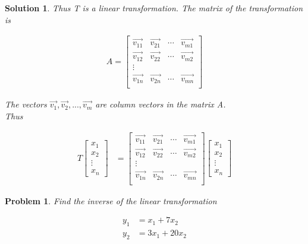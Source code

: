\documentclass{article}
\newtheorem{problem}{Problem}
\newtheorem*{solution}{Solution}
\begin{document}
\begin{solution}
Thus T is a linear transformation. The matrix of the transformation is

\begin{align*}
A = \begin{bmatrix}
\vec{v_{11}} & \vec{v_{21}} & \cdots & \vec{v_{m1}} \\
\vec{v_{12}} & \vec{v_{22}} & \cdots & \vec{v_{m2}} \\
\vdots \\
\vec{v_{1n}} & \vec{v_{2n}} & \cdots & \vec{v_{mn}} \\
\end{bmatrix}
\end{align*}

The vectors $\vec{v_{1}}, \vec{v_{2}}, ..., \vec{v_{m}}$ are column vectors in the matrix A. \\

Thus 

\begin{align*}
T \begin{bmatrix} x_{1} \\ x_{2} \\ \vdots \\ x_{n} \end{bmatrix} &= \begin{bmatrix}
\vec{v_{11}} & \vec{v_{21}} & \cdots & \vec{v_{m1}} \\
\vec{v_{12}} & \vec{v_{22}} & \cdots & \vec{v_{m2}} \\
\vdots \\
\vec{v_{1n}} & \vec{v_{2n}} & \cdots & \vec{v_{mn}} \\
\end{bmatrix} 
\begin{bmatrix} x_{1} \\ x_{2} \\ \vdots \\ x_{n} \end{bmatrix}
\end{align*}
\end{solution}

\begin{problem}
Find the inverse of the linear transformation 

\begin{align*}
y_{1} &= x_{1} + 7x_{2} \\
y_{2} &= 3x_{1} + 20x_{2}
\end{align*}
\end{problem}
\end{document}
